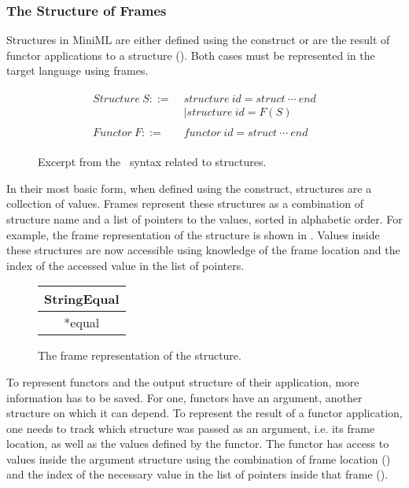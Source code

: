 \subsubsection{The Structure of Frames \label{sec:StructureOfFrames}}
Structures in MiniML are either defined using the  construct or are the result of functor applications to a structure ().
Both cases must be represented in the target language using frames.

\begin{figure}[htb]
\begin{align*}
\begin{aligned}
\mathit{Structure\ }S ::=\; &\mathit{structure\ } \mathit{id} = \mathit{struct\ }\cdots \mathit{\ end}\\
& |\mathit{structure\ } \mathit{id} = F(S)\\
\\
\mathit{Functor\ }F ::=\;&\mathit{functor\ } \mathit{id} = \mathit{struct\ }\cdots\mathit{\ end}
\end{aligned}
\end{align*}
\caption[\MiniML\ Structure Syntax(excerpt)]{Excerpt from the \MiniML\ syntax related to structures\label{fig:FunctorGrammarExcerpt}.}
\end{figure}

In their most basic form, when defined using the  construct, structures are a collection of values.
Frames represent these structures as a combination of structure name and a list of pointers to the values, sorted in alphabetic order.
For example, the frame representation of the  structure is shown in .
Values inside these structures are now accessible using knowledge of the frame location and the index of the accessed value in the list of pointers.

\begin{figure}[H]
\centering
\begin{tabular}{|c|}
\hline
StringEqual \\
\hline
*equal \\
\hline
\end{tabular}
\caption[Frame Representation Example: StringEqual]{The frame representation of the  structure.\label{fig:StringEqualFrame}}
\end{figure}

To represent functors and the output structure of their application, more information has to be saved. 
For one, functors have an argument, another structure on which it can depend.
To represent the result of a functor application, one needs to track which structure was passed as an argument, i.e. its frame location, as well as the values defined by the functor.
The functor has access to values inside the argument structure using the combination of frame location () and the index of the necessary value in the list of pointers inside that frame ().

